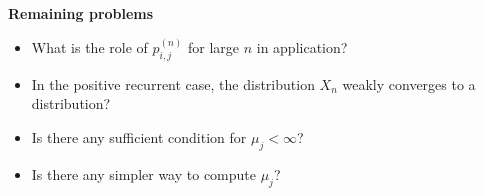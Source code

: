 \textbf{Remaining problems}
\begin{itemize}
\item
What is the role of $p_{i,j}^{(n)}$ for large $n$ in application?
\item
In the positive recurrent case, the distribution $X_n$ weakly converges to a distribution?
\item
Is there any sufficient condition for $\mu_j<\infty$?
\item
Is there any simpler way to compute $\mu_j$?
\end{itemize}















